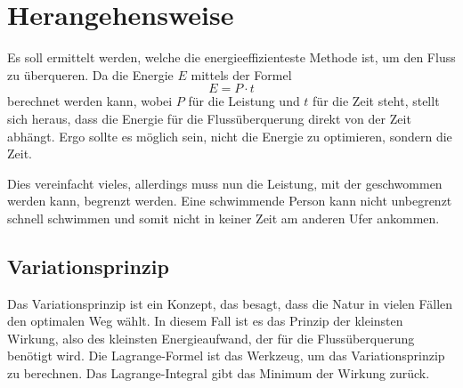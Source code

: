 %
%
%
%
\section{Herangehensweise\label{schwimmen:section:teil0}}

Es soll ermittelt werden, welche die energieeffizienteste Methode ist, um den Fluss zu überqueren. Da die Energie \(E\) mittels der Formel \[E = P \cdot t\] berechnet werden kann, wobei \(P\) für die Leistung und \(t\) für die Zeit steht, stellt sich heraus, dass die Energie für die Flussüberquerung direkt von der Zeit abhängt. Ergo sollte es möglich sein, nicht die Energie zu optimieren, sondern die Zeit.

Dies vereinfacht vieles, allerdings muss nun die Leistung, mit der geschwommen werden kann, begrenzt werden. Eine schwimmende Person kann nicht unbegrenzt schnell schwimmen und somit nicht in keiner Zeit am anderen Ufer ankommen.

\subsection{Variationsprinzip}
Das Variationsprinzip ist ein Konzept, das besagt, dass die Natur in vielen Fällen den optimalen Weg wählt. In diesem Fall ist es das Prinzip der kleinsten Wirkung, also des kleinsten Energieaufwand, der für die Flussüberquerung benötigt wird. Die Lagrange-Formel ist das Werkzeug, um das Variationsprinzip zu berechnen. Das Lagrange-Integral gibt das Minimum der Wirkung zurück.














